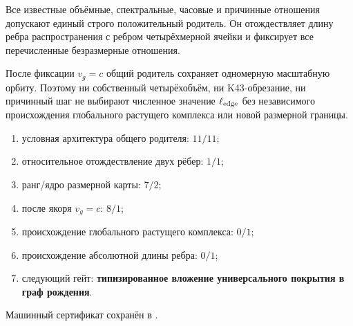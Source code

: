 \begin{theorem}
Все известные объёмные, спектральные, часовые и причинные отношения допускают
единый строго положительный родитель. Он отождествляет длину ребра
распространения с ребром четырёхмерной ячейки и фиксирует все перечисленные
безразмерные отношения.
\end{theorem}

\begin{nogocriterion}
После фиксации $v_g=c$ общий родитель сохраняет одномерную масштабную орбиту.
Поэтому ни собственный четырёхобъём, ни K43-обрезание, ни причинный шаг не
выбирают численное значение $\ell_{\rm edge}$ без независимого происхождения
глобального растущего комплекса или новой размерной границы.
\end{nogocriterion}

\begin{protocol}\begin{enumerate}
\item условная архитектура общего родителя: \textbf{$11/11$};
\item относительное отождествление двух рёбер: \textbf{$1/1$};
\item ранг/ядро размерной карты: \textbf{$7/2$};
\item после якоря $v_g=c$: \textbf{$8/1$};
\item происхождение глобального растущего комплекса: \textbf{$0/1$};
\item происхождение абсолютной длины ребра: \textbf{$0/1$};
\item следующий гейт: \textbf{типизированное вложение универсального
покрытия в граф рождения}.
\end{enumerate}\end{protocol}

Машинный сертификат сохранён в
.